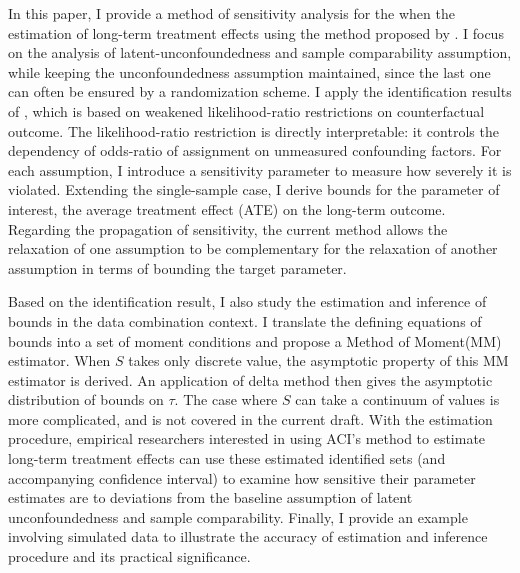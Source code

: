 \documentclass[12pt]{article}
\begin{document}
	
	In this paper, I provide a method of sensitivity analysis for the when the estimation of long-term treatment effects using the method proposed by \textcite{athey2020combining}. I focus on the analysis of latent-unconfoundedness and sample comparability assumption, while keeping the unconfoundedness assumption maintained, since the last one can often be ensured by a randomization scheme.  
    I apply the identification results of \textcite{yadlowsky2018bounds}, which is based on weakened likelihood-ratio restrictions on counterfactual outcome. The likelihood-ratio restriction is directly interpretable: it controls the dependency of odds-ratio of assignment on unmeasured confounding factors. For each assumption, I introduce a sensitivity parameter to measure how severely it is violated. Extending the single-sample case, I derive bounds for the parameter of interest, the average treatment effect (ATE) on the long-term outcome. Regarding the propagation of sensitivity, the current method allows the relaxation of one assumption to be complementary for the relaxation of another assumption in terms of bounding the target parameter.
	
	
	Based on the identification result, I also study the estimation and inference of bounds in the data combination context.
    I translate the defining equations of bounds into a set of moment conditions and propose a Method of Moment(MM) estimator. 
    When $S$ takes only discrete value, the asymptotic property of this MM estimator is derived. An application of delta method then gives the asymptotic distribution of bounds on $\tau$. The case where $S$ can take a continuum of values is more complicated, and is not covered in the current draft.
    With the estimation procedure, empirical researchers interested in using ACI's method to estimate long-term treatment effects can use these estimated identified sets (and accompanying confidence interval) to examine how sensitive their parameter estimates are to deviations from the baseline assumption of latent unconfoundedness and sample comparability. 
    Finally, I provide an example involving simulated data to illustrate the accuracy of estimation and inference procedure and its practical significance. 
	
\end{document}
